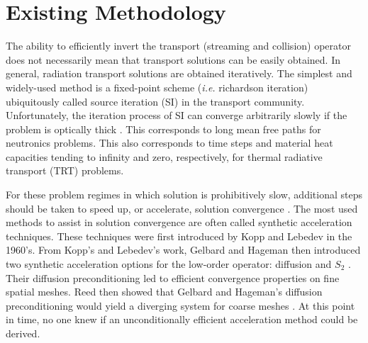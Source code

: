 \documentclass[11pt]{article}
\begin{document}
\section{Existing Methodology}
\label{sec::PS}

The ability to efficiently invert the transport (streaming and collision) operator does not necessarily mean that transport solutions can be easily obtained. In general, radiation transport solutions are obtained iteratively. The simplest and widely-used method is a fixed-point scheme ({\em i.e.} richardson iteration) ubiquitously called source iteration (SI) in the transport community. Unfortunately, the iteration process of SI can converge arbitrarily slowly if the problem is optically thick \cite{ref::adams_larsen_iter_methods}. This corresponds to long mean free paths for neutronics problems. This also corresponds to time steps and material heat capacities tending to infinity and zero, respectively, for thermal radiative transport (TRT) problems.

For these problem regimes in which solution is prohibitively slow, additional steps should be taken to speed up, or accelerate, solution convergence \cite{ref::adams_larsen_iter_methods}. The most used methods to assist in solution convergence are often called synthetic acceleration techniques. These techniques were first introduced by Kopp  \cite{kopp1963synthetic} and Lebedev \cite{lebedevI} in the 1960's. From Kopp's and Lebedev's work, Gelbard and Hageman then introduced two synthetic acceleration options for the low-order operator: diffusion and $S_2$ \cite{gelbard1969synthetic}. Their diffusion preconditioning led to efficient convergence properties on fine spatial meshes. Reed then showed that Gelbard and Hageman's diffusion preconditioning would yield a diverging system for coarse meshes \cite{reed1971effectiveness}. At this point in time, no one knew if an unconditionally efficient acceleration method could be derived.
\end{document}
